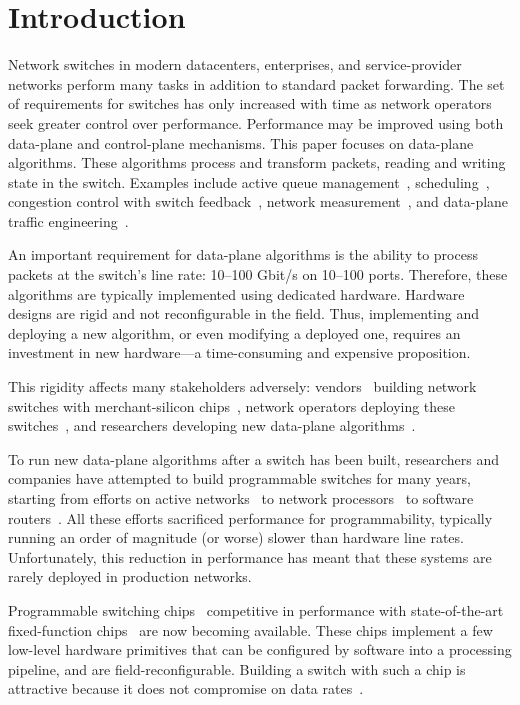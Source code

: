 \pagebreak
\section{Introduction}
\label{s:intro}
Network switches in modern datacenters, enterprises, and service-provider
networks perform many tasks in addition to standard packet forwarding. The set
of requirements for switches has only increased with time as network operators
seek greater control over performance.  Performance may be improved using both
data-plane and control-plane mechanisms. This paper focuses on data-plane
algorithms. These algorithms process and transform packets, reading and
writing state in the switch. Examples include active queue
management~\cite{red,avq,codel}, scheduling~\cite{pifo_hotnets}, congestion
control with switch feedback~\cite{xcp, rcp}, network
measurement~\cite{opensketch, bitmap_george}, and data-plane traffic
engineering~\cite{conga}.

An important requirement for data-plane algorithms is the ability to process
packets at the switch's line rate: 10--100 Gbit/s on 10--100 ports.  Therefore,
these algorithms are typically implemented using dedicated hardware.  Hardware
designs are rigid and not reconfigurable in the field. Thus, implementing and
deploying a new algorithm, or even modifying a deployed one, requires an
investment in new hardware---a time-consuming and expensive proposition.

This rigidity affects many stakeholders adversely: vendors~\cite{arista_7050, cisco_nexus,
dell_force10} building network switches with merchant-silicon
chips~\cite{trident, tomahawk, mellanox}, network operators deploying these
switches~\cite{vl2, facebook, google}, and researchers developing new data-plane
algorithms~\cite{conga, bitmap_george, xcp, rcp}.

To run new data-plane algorithms after a switch has been built, researchers and
companies have attempted to build programmable switches for many years,
starting from efforts on active networks~\cite{active-nets} to network
processors~\cite{ixp4xx} to software routers~\cite{dpdk, click}. All these
efforts sacrificed performance for programmability, typically running an order
of magnitude (or worse) slower than hardware line rates. Unfortunately, this
reduction in performance has meant that these systems are rarely deployed in
production networks.

Programmable switching chips~\cite{tofino, flexpipe, xpliant} competitive in
performance with state-of-the-art fixed-function chips~\cite{trident,
tomahawk, mellanox} are now becoming available. These chips implement a few
low-level hardware primitives that can be configured by software into a
processing pipeline, and are field-reconfigurable. Building a switch with such
a chip is attractive because it does not compromise on data rates~\cite{rmt}.

